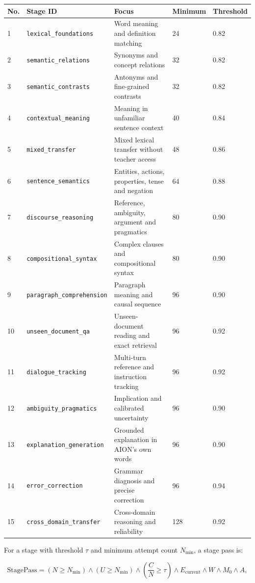 \documentclass[11pt,a4paper]{article}
\begin{document}
\begin{longtable}{p{} p{} p{} p{} p{}}
\toprule
No. & Stage ID & Focus & Minimum & Threshold \\
\midrule
\endhead
1 & \texttt{lexical\_foundations} & Word meaning and definition matching & 24 & 0.82 \\
2 & \texttt{semantic\_relations} & Synonyms and concept relations & 32 & 0.82 \\
3 & \texttt{semantic\_contrasts} & Antonyms and fine-grained contrasts & 32 & 0.82 \\
4 & \texttt{contextual\_meaning} & Meaning in unfamiliar sentence context & 40 & 0.84 \\
5 & \texttt{mixed\_transfer} & Mixed lexical transfer without teacher access & 48 & 0.86 \\
6 & \texttt{sentence\_semantics} & Entities, actions, properties, tense and negation & 64 & 0.88 \\
7 & \texttt{discourse\_reasoning} & Reference, ambiguity, argument and pragmatics & 80 & 0.90 \\
8 & \texttt{compositional\_syntax} & Complex clauses and compositional syntax & 80 & 0.90 \\
9 & \texttt{paragraph\_comprehension} & Paragraph meaning and causal sequence & 96 & 0.90 \\
10 & \texttt{unseen\_document\_qa} & Unseen-document reading and exact retrieval & 96 & 0.92 \\
11 & \texttt{dialogue\_tracking} & Multi-turn reference and instruction tracking & 96 & 0.92 \\
12 & \texttt{ambiguity\_pragmatics} & Implication and calibrated uncertainty & 96 & 0.90 \\
13 & \texttt{explanation\_generation} & Grounded explanation in AION's own words & 96 & 0.90 \\
14 & \texttt{error\_correction} & Grammar diagnosis and precise correction & 96 & 0.94 \\
15 & \texttt{cross\_domain\_transfer} & Cross-domain reasoning and reliability & 128 & 0.92 \\
\bottomrule
\end{longtable}

For a stage with threshold $\tau$ and minimum attempt count $N_{\min}$, a stage pass is:

\[
\mathrm{StagePass} =
  (N \geq N_{\min}) \land
  (U \geq N_{\min}) \land
  \left(\frac{C}{N} \geq \tau\right) \land
  E_{\mathrm{current}} \land W \land M_{0} \land A,
\]
\end{document}
